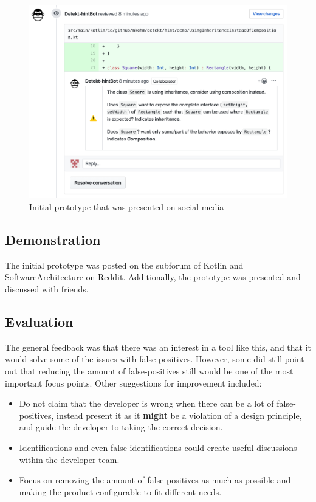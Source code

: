 \documentclass{report}
\begin{document}
\begin{figure}[h!]
    \centering
    \includegraphics[width=\textwidth]{../images/demo.png}
    \caption{Initial prototype that was presented on social media}
    \label{fig:mockup}
\end{figure}

\subsection*{Demonstration}
The initial prototype was posted on the subforum of Kotlin\cite{kotlin-reddit} and SoftwareArchitecture\cite{softwarearch-reddit} on Reddit. Additionally, the prototype was presented and discussed with friends. 

\subsection*{Evaluation}

The general feedback was that there was an interest in a tool like this, and that it would solve some of the issues with false-positives. However, some did still point out that reducing the amount of false-positives still would be one of the most important focus points. Other suggestions for improvement included: 
\begin{itemize}
    \item Do not claim that the developer is wrong when there can be a lot of false-positives, instead present it as it \textbf{might} be a violation of a design principle, and guide the developer to taking the correct decision.
    \item Identifications and even false-identifications could create useful discussions within the developer team.
    \item Focus on removing the amount of false-positives as much as possible and making the product configurable to fit different needs.
\end{itemize}
\end{document}

